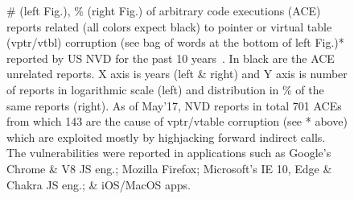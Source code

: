 \begin{figure}[t!]
\centering
{}
\vspace{-.7cm}
\caption{\# (left Fig.), \% (right Fig.) of arbitrary code executions (ACE) reports related (all colors expect black) to pointer or virtual table (vptr/vtbl) corruption 
(see bag of words at the bottom of left Fig.)* reported by US NVD for the past 10 years~\cite{NVD:ACE}. In black are the ACE unrelated reports.
X axis is years (left \& right) and Y axis is number of reports in logarithmic scale (left) and distribution in \% of the same reports (right).
As of May'17, NVD reports in total 701 ACEs from which 143 are the cause of vptr/vtable corruption (see * above) 
which are exploited mostly by highjacking forward indirect calls.
The vulnerabilities were reported in applications such as Google's Chrome \& V8 JS eng.; Mozilla Firefox; Microsoft's IE 10, Edge \& Chakra JS eng.;
\& iOS/MacOS apps.}
\label{ace:nvd:statistics}
\vspace{-.5cm}
\end{figure}

